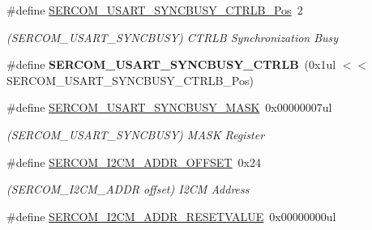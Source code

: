\begin{DoxyCompactItemize}
\item 
\hypertarget{group___s_a_m_l21___s_e_r_c_o_m_gaad7bfdc9a09c4a18277f2cfc807ff9bf}{}\#define \hyperlink{group___s_a_m_l21___s_e_r_c_o_m_gaad7bfdc9a09c4a18277f2cfc807ff9bf}{S\+E\+R\+C\+O\+M\+\_\+\+U\+S\+A\+R\+T\+\_\+\+S\+Y\+N\+C\+B\+U\+S\+Y\+\_\+\+C\+T\+R\+L\+B\+\_\+\+Pos}~2\label{group___s_a_m_l21___s_e_r_c_o_m_gaad7bfdc9a09c4a18277f2cfc807ff9bf}

\begin{DoxyCompactList}\small\item\em (S\+E\+R\+C\+O\+M\+\_\+\+U\+S\+A\+R\+T\+\_\+\+S\+Y\+N\+C\+B\+U\+S\+Y) C\+T\+R\+L\+B Synchronization Busy \end{DoxyCompactList}\item 
\hypertarget{group___s_a_m_l21___s_e_r_c_o_m_gacb71cc03f092300eebfe4a3a31228fbd}{}\#define {\bfseries S\+E\+R\+C\+O\+M\+\_\+\+U\+S\+A\+R\+T\+\_\+\+S\+Y\+N\+C\+B\+U\+S\+Y\+\_\+\+C\+T\+R\+L\+B}~(0x1ul $<$$<$ S\+E\+R\+C\+O\+M\+\_\+\+U\+S\+A\+R\+T\+\_\+\+S\+Y\+N\+C\+B\+U\+S\+Y\+\_\+\+C\+T\+R\+L\+B\+\_\+\+Pos)\label{group___s_a_m_l21___s_e_r_c_o_m_gacb71cc03f092300eebfe4a3a31228fbd}

\item 
\hypertarget{group___s_a_m_l21___s_e_r_c_o_m_ga798716a87519e0b27a62761dd72c6e9b}{}\#define \hyperlink{group___s_a_m_l21___s_e_r_c_o_m_ga798716a87519e0b27a62761dd72c6e9b}{S\+E\+R\+C\+O\+M\+\_\+\+U\+S\+A\+R\+T\+\_\+\+S\+Y\+N\+C\+B\+U\+S\+Y\+\_\+\+M\+A\+S\+K}~0x00000007ul\label{group___s_a_m_l21___s_e_r_c_o_m_ga798716a87519e0b27a62761dd72c6e9b}

\begin{DoxyCompactList}\small\item\em (S\+E\+R\+C\+O\+M\+\_\+\+U\+S\+A\+R\+T\+\_\+\+S\+Y\+N\+C\+B\+U\+S\+Y) M\+A\+S\+K Register \end{DoxyCompactList}\item 
\hypertarget{group___s_a_m_l21___s_e_r_c_o_m_gac62d952a548796045e825366cd82f60a}{}\#define \hyperlink{group___s_a_m_l21___s_e_r_c_o_m_gac62d952a548796045e825366cd82f60a}{S\+E\+R\+C\+O\+M\+\_\+\+I2\+C\+M\+\_\+\+A\+D\+D\+R\+\_\+\+O\+F\+F\+S\+E\+T}~0x24\label{group___s_a_m_l21___s_e_r_c_o_m_gac62d952a548796045e825366cd82f60a}

\begin{DoxyCompactList}\small\item\em (S\+E\+R\+C\+O\+M\+\_\+\+I2\+C\+M\+\_\+\+A\+D\+D\+R offset) I2\+C\+M Address \end{DoxyCompactList}\item 
\hypertarget{group___s_a_m_l21___s_e_r_c_o_m_ga83f400f84966f4c24a17f5113a0dee63}{}\#define \hyperlink{group___s_a_m_l21___s_e_r_c_o_m_ga83f400f84966f4c24a17f5113a0dee63}{S\+E\+R\+C\+O\+M\+\_\+\+I2\+C\+M\+\_\+\+A\+D\+D\+R\+\_\+\+R\+E\+S\+E\+T\+V\+A\+L\+U\+E}~0x00000000ul\label{group___s_a_m_l21___s_e_r_c_o_m_ga83f400f84966f4c24a17f5113a0dee63}


\end{DoxyCompactItemize}
